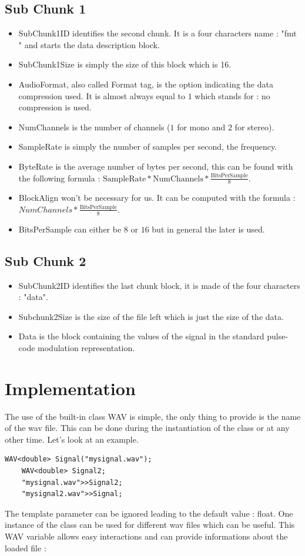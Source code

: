 \documentclass[a4paper]{report}
\begin{document}
\subsection*{Sub Chunk 1}
\begin{itemize}
\item SubChunk1ID identifies the second chunk. It is a four characters name : "fmt "  and starts the data description block. 
\item SubChunk1Size is simply the size of this block which is 16. 
\item AudioFormat, also called Format tag, is the option indicating the data compression used. It is almost always equal to $1$ which stands for : no compression is used. 
\item NumChannels is the number of channels ($1$ for mono and $2$ for stereo). 
\item SampleRate is simply the number of samples per second, the frequency. 
\item ByteRate is the average number of bytes per second, this can be found with the following formula : $\text{SampleRate} * \text{NumChannels}*\frac{\text{BitsPerSample}}{8}$. 
\item BlockAlign won't be necessary for us. It can be computed with the formula : $NumChannels*\frac{\text{BitsPerSample}}{8}$.
\item BitsPerSample can either be $8$ or $16$ but in general the later is used.
\end{itemize}

\subsection*{Sub Chunk 2}
\begin{itemize}
\item SubChunk2ID identifies the last chunk block, it is made of the four characters : "data".
\item Subchunk2Size is the size of the file left which is just the size of the data. 
\item Data is the block containing the values of the signal in the standard pulse-code modulation representation.
\end{itemize}


\section{Implementation}
The use of the built-in class WAV is simple, the only thing to provide is the name of the wav file. This can be done during the instantiation of the class or at any other time. Let's look at an example.
\begin{lstlisting}[basicstyle=\tiny]
    WAV<double> Signal("mysignal.wav");
    WAV<double> Signal2;
    "mysignal.wav">>Signal2;
    "mysignal2.wav">>Signal;
\end{lstlisting}
The template parameter can be ignored leading to the default value : float. One instance of the class can be used for different wav files which can be useful. This WAV variable allows easy interactions and can provide informations about the loaded file :
\end{document}
